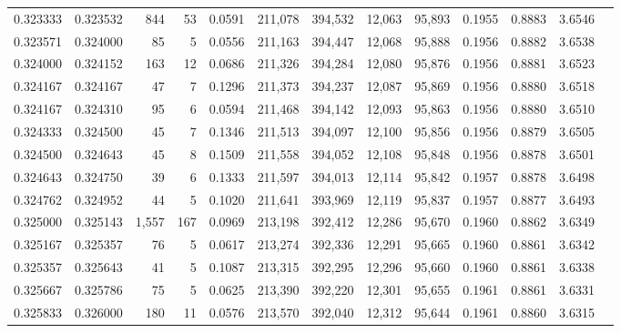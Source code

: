 \begin{tabular}{rrrrrrrrrrrrr}
0.323333 & 0.323532 &   844 &  53 &                                     0.0591 & 211,078 & 394,532 &  12,063 &  95,893 & 0.1955 & 0.8883 & 3.6546 \\
0.323571 & 0.324000 &    85 &   5 &                                     0.0556 & 211,163 & 394,447 &  12,068 &  95,888 & 0.1956 & 0.8882 & 3.6538 \\
0.324000 & 0.324152 &   163 &  12 &                                     0.0686 & 211,326 & 394,284 &  12,080 &  95,876 & 0.1956 & 0.8881 & 3.6523 \\
0.324167 & 0.324167 &    47 &   7 &                                     0.1296 & 211,373 & 394,237 &  12,087 &  95,869 & 0.1956 & 0.8880 & 3.6518 \\
0.324167 & 0.324310 &    95 &   6 &                                     0.0594 & 211,468 & 394,142 &  12,093 &  95,863 & 0.1956 & 0.8880 & 3.6510 \\
0.324333 & 0.324500 &    45 &   7 &                                     0.1346 & 211,513 & 394,097 &  12,100 &  95,856 & 0.1956 & 0.8879 & 3.6505 \\
0.324500 & 0.324643 &    45 &   8 &                                     0.1509 & 211,558 & 394,052 &  12,108 &  95,848 & 0.1956 & 0.8878 & 3.6501 \\
0.324643 & 0.324750 &    39 &   6 &                                     0.1333 & 211,597 & 394,013 &  12,114 &  95,842 & 0.1957 & 0.8878 & 3.6498 \\
0.324762 & 0.324952 &    44 &   5 &                                     0.1020 & 211,641 & 393,969 &  12,119 &  95,837 & 0.1957 & 0.8877 & 3.6493 \\
0.325000 & 0.325143 & 1,557 & 167 &                                     0.0969 & 213,198 & 392,412 &  12,286 &  95,670 & 0.1960 & 0.8862 & 3.6349 \\
0.325167 & 0.325357 &    76 &   5 &                                     0.0617 & 213,274 & 392,336 &  12,291 &  95,665 & 0.1960 & 0.8861 & 3.6342 \\
0.325357 & 0.325643 &    41 &   5 &                                     0.1087 & 213,315 & 392,295 &  12,296 &  95,660 & 0.1960 & 0.8861 & 3.6338 \\
0.325667 & 0.325786 &    75 &   5 &                                     0.0625 & 213,390 & 392,220 &  12,301 &  95,655 & 0.1961 & 0.8861 & 3.6331 \\
0.325833 & 0.326000 &   180 &  11 &                                     0.0576 & 213,570 & 392,040 &  12,312 &  95,644 & 0.1961 & 0.8860 & 3.6315 \\

\end{tabular}
